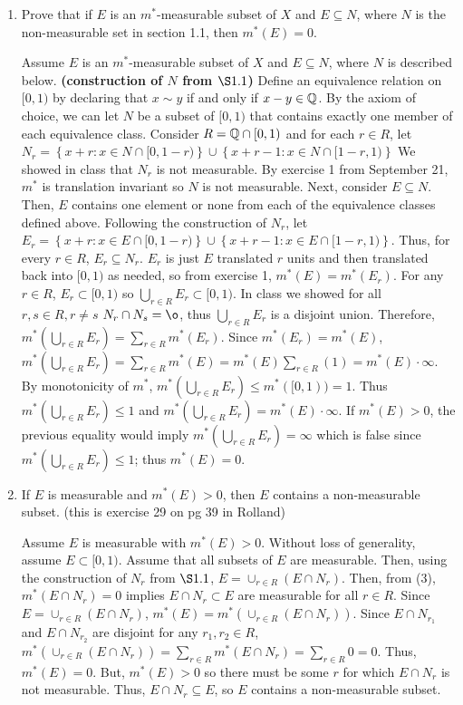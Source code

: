 \begin{enumerate}
\item Prove that if $E$ is an $m^{*}$-measurable subset of $X$ and $E \subseteq N$, where $N$ is the non-measurable set in section 1.1, then $m^{*}(E)=0$. 
\begin{pf}
Assume $E$ is an $m^{*}$-measurable subset of $X$ and $E \subseteq N$, where $N$ is described below.
\textbf{(construction of $N$ from $\S 1.1$)} Define an equivalence relation on $[0,1)$ by declaring that $x \sim y$ if and only if $x - y \in {\mathbb Q}$. By the axiom of choice, we can let $N$ be a subset of $[0,1)$ that contains exactly one member of each equivalence class. Consider $R={\mathbb Q} \cap [0,1)$ and for each $r \in R$, let
$
N_r=\left\lbrace x + r: x \in N \cap [0, 1-r) \right\rbrace \cup \left\lbrace x+r-1 : x \in N\cap [1-r, 1) \right\rbrace
$
We showed in class that $N_r$ is not measurable. By exercise 1 from September 21, $m^{*}$ is translation invariant so $N$ is not measurable.
Next, consider $E \subseteq N$. Then, $E$ contains one element or none from each of the equivalence classes defined above. 
Following the construction of $N_r$, let  $E_r=\left\lbrace x + r: x \in E \cap [0, 1-r) \right\rbrace \cup \left\lbrace x+r-1 : x \in E\cap [1-r, 1) \right\rbrace.$
Thus, for every $r \in R$, $E_r \subseteq N_r$. $E_r$ is just $E$ translated $r$ units and then translated back into $[0,1)$ as needed, so from exercise 1, $m^{*}(E)=m^{*}(E_r)$. For any $r \in R$, $E_r \subset [0,1)$ so $\bigcup_{r \in R} E_r \subset [0, 1)$. In class we showed for all $r, s \in R, r\neq s$ $N_r \cap N_s = \o$, thus $\bigcup_{r \in R} E_r$ is a disjoint union. Therefore, $m^{*}(\bigcup_{r \in R} E_r) = \sum_{r \in R}m^{*}(E_r)$. Since $m^{*}(E_r)=m^{*}(E)$, $m^{*}(\bigcup_{r \in R} E_r) = \sum_{r \in R}m^{*}(E) = m^{*}(E)\sum_{r \in R}(1)=m^{*}(E) \cdot \infty$. By monotonicity of $m^{*}$, $m^{*}(\bigcup_{r \in R} E_r)\leq m^{*}([0,1))=1$.   Thus $m^{*}(\bigcup_{r \in R} E_r)\leq 1$ and $m^{*}(\bigcup_{r \in R} E_r)=m^{*}(E) \cdot \infty$. If $m^{*}(E)>0$, the previous equality would imply $m^{*}(\bigcup_{r \in R} E_r)= \infty$ which is false since $m^{*}(\bigcup_{r \in R} E_r)\leq 1$; thus $m^{*}(E)=0$.
\end{pf}
\item If $E$ is measurable and $m^{*}(E)>0$, then $E$ contains a non-measurable subset. (this is exercise 29 on pg 39 in Rolland)
\begin{pf}
Assume $E$ is measurable with $m^*(E) > 0$. Without loss of generality, assume $E \subset [0,1)$. Assume that all subsets of $E$ are measurable. Then, using the construction of $N_r$ from $\S 1.1$, $E = \cup_{r \in R}(E \cap N_r)$. Then, from (3), $m^*(E \cap N_r)=0$ implies $E \cap N_r \subset E$ are measurable for all $r \in R$.  Since  $E = \cup_{r \in R}(E \cap N_r)$, $m^*(E)=m^*(\cup_{r \in R}(E \cap N_r))$. Since $E \cap N_{r_1}$ and $E \cap N_{r_2}$ are disjoint for any $r_1, r_2 \in R$, $m^*(\cup_{r \in R}(E \cap N_r))= \sum_{r\in R}m^*(E \cap N_r)=\sum_{r \in R}0=0$. Thus, $m^*(E)=0$. But, $m^*(E)>0$ so there must be some $r$ for which $E \cap N_r$ is not measurable. Thus, $E \cap N_r \subseteq E$, so $E$ contains a non-measurable subset.  \\

\end{pf}
\end{enumerate}
